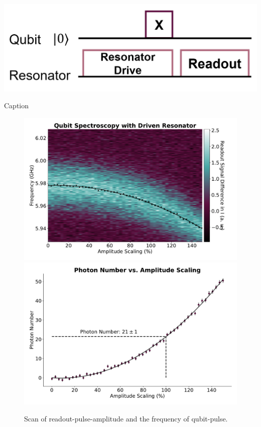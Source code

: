 \begin{marginfigure}[-4 cm]
    \centering
    \includegraphics{Figs/circuits/photon_counting.png}
    \caption{Caption}
    \label{fig:photon_counting_circuit}
\end{marginfigure}

\begin{figure}[h]
    \centering
    \includegraphics[width = \linewidth]{Calibrations/Figures/Qubit Spectroscopy with Driven Resonator.pdf}
    \includegraphics[width = \linewidth]{Calibrations/Figures/photon_number.pdf}
    \caption{Scan of readout-pulse-amplitude and the frequency of qubit-pulse.}
    \label{fig:calibration_photon_counting_scan}
\end{figure}

